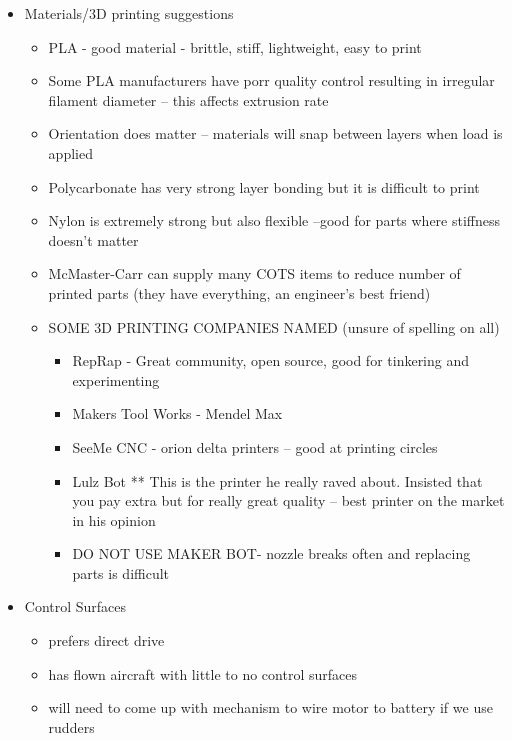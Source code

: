\documentclass{article}
\begin{document}
\begin{spacing}{1.1}
\newpage

\begin{itemize}

\item Materials/3D printing suggestions

\begin{itemize}
\item PLA - good material - brittle, stiff, lightweight, easy to print
\item Some PLA manufacturers have porr quality control resulting in irregular filament diameter -- this affects extrusion rate
\item Orientation does matter -- materials will snap between layers when load is applied
\item Polycarbonate has very strong layer bonding but it is difficult to print
\item Nylon is extremely strong but also flexible --good for parts where stiffness doesn't matter
\item  McMaster-Carr can supply many COTS items to reduce number of printed parts (they have everything, an engineer's best friend)
\item SOME 3D PRINTING COMPANIES NAMED (unsure of spelling on all)
\begin{itemize}
\item RepRap - Great community, open source, good for tinkering and experimenting
\item Makers Tool Works - Mendel Max
\item SeeMe CNC - orion delta printers -- good at printing circles
\item Lulz Bot ** This is the printer he really raved about. Insisted that you pay extra but for really great quality -- best printer on the market in his opinion
\item DO NOT USE MAKER BOT- nozzle breaks often and replacing parts is difficult
\end{itemize}
\end{itemize}

\item Control Surfaces
\begin{itemize}
\item prefers direct drive
\item has flown aircraft with little to no control surfaces
\item will need to come up with mechanism to wire motor to battery if we use rudders
\end{itemize}


\end{itemize}
\end{spacing}
\end{document}
